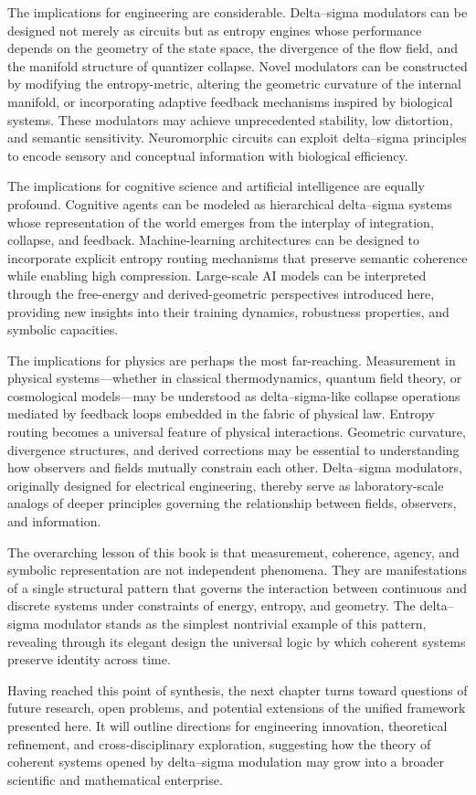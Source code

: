 The implications for engineering are considerable. Delta–sigma modulators can be designed not merely as circuits but as entropy engines whose performance depends on the geometry of the state space, the divergence of the flow field, and the manifold structure of quantizer collapse. Novel modulators can be constructed by modifying the entropy-metric, altering the geometric curvature of the internal manifold, or incorporating adaptive feedback mechanisms inspired by biological systems. These modulators may achieve unprecedented stability, low distortion, and semantic sensitivity. Neuromorphic circuits can exploit delta–sigma principles to encode sensory and conceptual information with biological efficiency.

The implications for cognitive science and artificial intelligence are equally profound. Cognitive agents can be modeled as hierarchical delta–sigma systems whose representation of the world emerges from the interplay of integration, collapse, and feedback. Machine-learning architectures can be designed to incorporate explicit entropy routing mechanisms that preserve semantic coherence while enabling high compression. Large-scale AI models can be interpreted through the free-energy and derived-geometric perspectives introduced here, providing new insights into their training dynamics, robustness properties, and symbolic capacities.

The implications for physics are perhaps the most far-reaching. Measurement in physical systems—whether in classical thermodynamics, quantum field theory, or cosmological models—may be understood as delta–sigma-like collapse operations mediated by feedback loops embedded in the fabric of physical law. Entropy routing becomes a universal feature of physical interactions. Geometric curvature, divergence structures, and derived corrections may be essential to understanding how observers and fields mutually constrain each other. Delta–sigma modulators, originally designed for electrical engineering, thereby serve as laboratory-scale analogs of deeper principles governing the relationship between fields, observers, and information.

The overarching lesson of this book is that measurement, coherence, agency, and symbolic representation are not independent phenomena. They are manifestations of a single structural pattern that governs the interaction between continuous and discrete systems under constraints of energy, entropy, and geometry. The delta–sigma modulator stands as the simplest nontrivial example of this pattern, revealing through its elegant design the universal logic by which coherent systems preserve identity across time.

Having reached this point of synthesis, the next chapter turns toward questions of future research, open problems, and potential extensions of the unified framework presented here. It will outline directions for engineering innovation, theoretical refinement, and cross-disciplinary exploration, suggesting how the theory of coherent systems opened by delta–sigma modulation may grow into a broader scientific and mathematical enterprise.

